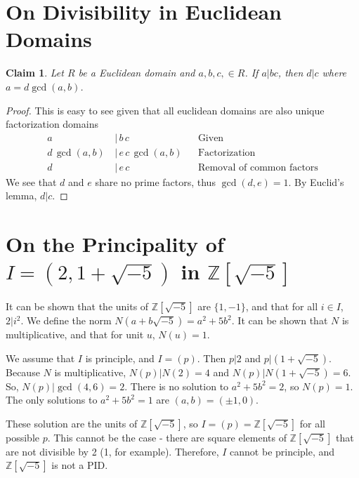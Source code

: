 \documentclass[12pt]{article}
\newtheorem*{claim*}{Claim}
\newcommand*{\Z}{\mathbb{Z}}
\begin{document}
\section{On Divisibility in Euclidean Domains}
\begin{claim*}
Let $R$ be a Euclidean domain and $a, b, c, \in R$. If $a|bc$, then $d|c$ where $a = d \gcd(a, b)$.
\end{claim*}
\begin{proof}
This is easy to see given that all euclidean domains are also unique factorization domains
\begin{align*}
a \, &| \, b \, c & & \text{Given}\\
d \, \gcd(a, b) \, &| \, e \, c \, \gcd(a, b) & & \text{Factorization}\\
d \, &| \, e \, c & & \text{Removal of common factors}
\end{align*}
\noindent We see that $d$ and $e$ share no prime factors, thus $\gcd(d, e) = 1$. By Euclid's lemma, $d | c$.
\end{proof}

\section{On the Principality of $I = (2, 1 + \sqrt{-5})$ in $\Z[\sqrt{-5}]$}
It can be shown that the units of $\Z[\sqrt{-5}]$ are $\{1, -1\}$, and that for all $i \in I$, $2 | i^2$. We define the norm $N(a + b \sqrt{-5}) = a^2 + 5b^2$. It can be shown that $N$ is multiplicative, and that for unit $u$, $N(u) = 1$. 

We assume that $I$ is principle, and $I = (p)$. Then $p | 2$ and $p | (1 + \sqrt{-5})$. Because $N$ is multiplicative, $N(p) | N(2) = 4$ and $N(p) | N(1 + \sqrt{-5}) = 6$. So, $N(p) | \gcd(4, 6) = 2$. There is no solution to $a^2 + 5b^2 = 2$, so $N(p) = 1$. The only solutions to $a^2 + 5b^2 = 1$ are $(a, b) = (\pm 1, 0)$.

These solution are the units of $\Z[\sqrt{-5}]$, so $I = (p) = \Z[\sqrt{-5}]$ for all possible $p$. This cannot be the case - there are square elements of $\Z[\sqrt{-5}]$ that are not divisible by 2 (1, for example). Therefore, $I$ cannot be principle, and $\Z[\sqrt{-5}]$ is not a PID.
\end{document}
